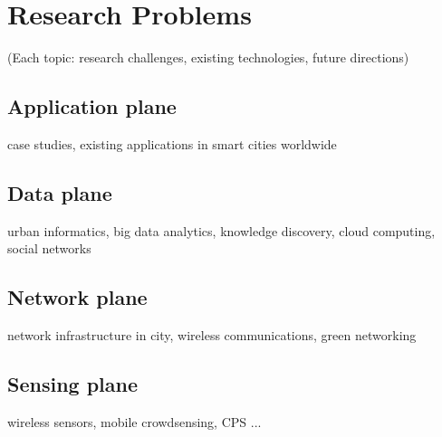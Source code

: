 
\section{Research Problems}

(Each topic: research challenges, existing technologies, future directions)

\subsection{Application plane} 
case studies, existing applications in smart cities worldwide

\subsection{Data plane}
urban informatics, big data analytics, knowledge discovery, cloud computing, social networks


\subsection{Network plane}
network infrastructure in city, wireless communications, green networking

\subsection{Sensing plane}
wireless sensors, mobile crowdsensing, CPS ...




